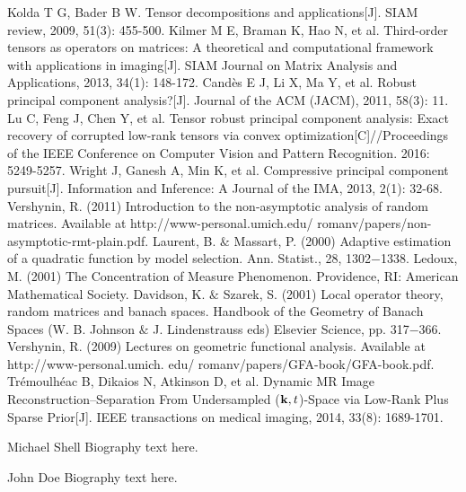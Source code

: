 \documentclass[journal,transmag]{IEEEtran}
\theoremstyle{plain}
\begin{document}
\begin{thebibliography}{1}

Kolda T G, Bader B W. Tensor decompositions and applications[J]. SIAM review, 2009, 51(3): 455-500.
Kilmer M E, Braman K, Hao N, et al. Third-order tensors as operators on matrices: A theoretical and computational framework with applications in imaging[J]. SIAM Journal on Matrix Analysis and Applications, 2013, 34(1): 148-172.
Candès E J, Li X, Ma Y, et al. Robust principal component analysis?[J]. Journal of the ACM (JACM), 2011, 58(3): 11.
Lu C, Feng J, Chen Y, et al. Tensor robust principal component analysis: Exact recovery of corrupted low-rank tensors via convex optimization[C]//Proceedings of the IEEE Conference on Computer Vision and Pattern Recognition. 2016: 5249-5257.
Wright J, Ganesh A, Min K, et al. Compressive principal component pursuit[J]. Information and Inference: A Journal of the IMA, 2013, 2(1): 32-68.
Vershynin, R. (2011) Introduction to the
    non-asymptotic analysis of random matrices. Available at
http://www-personal.umich.edu/ romanv/papers/non-asymptotic-rmt-plain.pdf.
Laurent, B. $\&$ Massart, P. (2000) Adaptive estimation of a quadratic function by model selection. Ann. Statist., 28, 1302$-$1338.
Ledoux, M. (2001) The Concentration of Measure Phenomenon. Providence, RI: American Mathematical
Society.
Davidson, K. $\&$ Szarek, S. (2001) Local operator theory, random matrices and banach spaces. Handbook of
the Geometry of Banach Spaces (W. B. Johnson $\&$ J. Lindenstrauss eds) Elsevier Science, pp. 317$-$366.
Vershynin, R. (2009) Lectures on geometric functional analysis. Available at http://www-personal.umich.
edu/ romanv/papers/GFA-book/GFA-book.pdf.
 Trémoulhéac B, Dikaios N, Atkinson D, et al. Dynamic MR Image Reconstruction–Separation From Undersampled (${\bf k}, t $)-Space via Low-Rank Plus Sparse Prior[J]. IEEE transactions on medical imaging, 2014, 33(8): 1689-1701.
\end{thebibliography}

\begin{IEEEbiography}{Michael Shell}
Biography text here.
\end{IEEEbiography}

\begin{IEEEbiographynophoto}{John Doe}
Biography text here.
\end{IEEEbiographynophoto}
\end{document}

